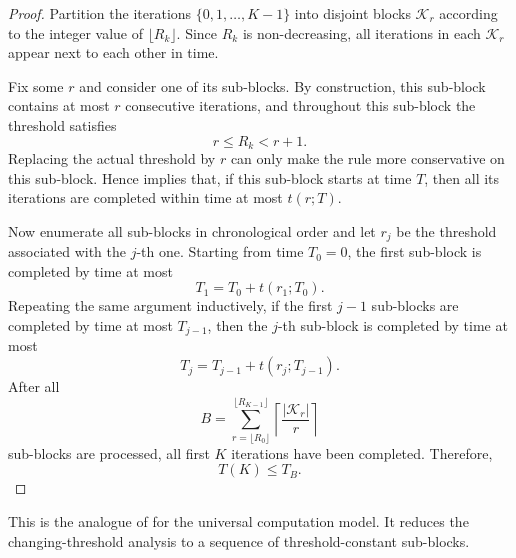 \documentclass{article}
\begin{document}
\begin{proof}
    Partition the iterations $\{0,1,\dots,K-1\}$ into disjoint blocks $\mathcal{K}_r$ according to the integer value of $\lfloor R_k \rfloor$.
    Since $R_k$ is non-decreasing, all iterations in each $\mathcal{K}_r$ appear next to each other in time.

    Fix some $r$ and consider one of its sub-blocks.
    By construction, this sub-block contains at most $r$ consecutive iterations, and throughout this sub-block the threshold satisfies
    \begin{equation*}
        r \le R_k < r+1.
    \end{equation*}
    Replacing the actual threshold by $r$ can only make the rule more conservative on this sub-block.
    Hence  implies that, if this sub-block starts at time $T$, then all its iterations are completed within time at most $t(r;T)$.

    Now enumerate all sub-blocks in chronological order and let $r_j$ be the threshold associated with the $j$-th one.
    Starting from time $T_0 = 0$, the first sub-block is completed by time at most
    \begin{equation*}
        T_1 = T_0 + t(r_1;T_0).
    \end{equation*}
    Repeating the same argument inductively, if the first $j-1$ sub-blocks are completed by time at most $T_{j-1}$, then the $j$-th sub-block is completed by time at most
    \begin{equation*}
        T_j = T_{j-1} + t(r_j;T_{j-1}).
    \end{equation*}
    After all
    \begin{equation*}
        B = \sum_{r=\lfloor R_0 \rfloor}^{\lfloor R_{K-1} \rfloor} \left\lceil \frac{|\mathcal{K}_r|}{r} \right\rceil
    \end{equation*}
    sub-blocks are processed, all first $K$ iterations have been completed. Therefore,
    \begin{equation*}
        T(K) \le T_B.
    \end{equation*}
\end{proof}

This is the analogue of  for the universal computation model.
It reduces the changing-threshold analysis to a sequence of threshold-constant sub-blocks.
\end{document}
